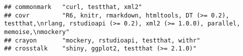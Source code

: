 \documentclass[]{book}
\begin{document}
\begin{verbatim}
## commonmark   "curl, testthat, xml2"                                                                                                                                                                                                                                                                                                                                                                                                                                                                                                                                                                                                                                                                                    
## covr         "R6, knitr, rmarkdown, htmltools, DT (>= 0.2), testthat,\nrlang, rstudioapi (>= 0.2), xml2 (>= 1.0.0), parallel, memoise,\nmockery"                                                                                                                                                                                                                                                                                                                                                                                                                                                                                                                                                                       
## crayon       "mockery, rstudioapi, testthat, withr"                                                                                                                                                                                                                                                                                                                                                                                                                                                                                                                                                                                                                                                                    
## crosstalk    "shiny, ggplot2, testthat (>= 2.1.0)"                                                                                                                                                                                                                                                                                                                                                                                                                                                                                                                                                                                                                                                                     

\end{verbatim}
\end{document}
